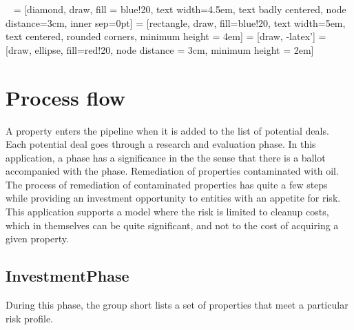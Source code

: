 \documentclass{article}
\begin{document}
\ %
 = [diamond, draw, fill = blue!20,
  text width=4.5em, text badly centered, node distance=3cm, inner sep=0pt]
 = [rectangle, draw, fill=blue!20, 
  text width=5em, text centered, rounded corners, minimum height = 4em]
 = [draw, -latex']
 = [draw, ellipse, fill=red!20, node distance = 3cm, minimum height = 2em]
\section{Process flow}
A property enters the pipeline when it is added to the list of potential deals. Each potential deal goes through a research and evaluation phase. In this application, a phase has a significance in the the sense that there is a ballot accompanied with the phase. Remediation of properties contaminated with oil. The process of remediation of contaminated properties has quite a few steps while providing an investment opportunity to entities with an appetite for risk. This application supports a model where the risk is limited to cleanup costs, which in themselves can be quite significant, and not to the cost of acquiring a given property. 


\subsection{InvestmentPhase}
  During this phase, the group short lists a set of properties that meet a particular risk profile. 
\end{document}
